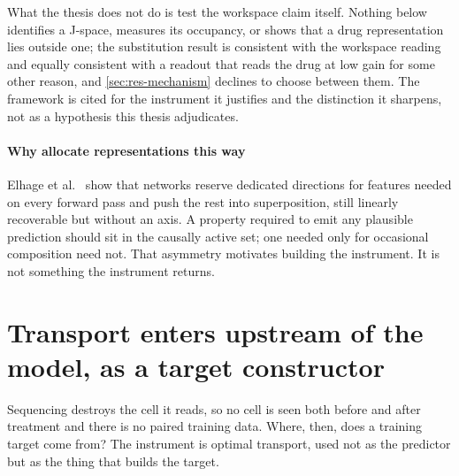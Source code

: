 %
\begin{scopelimit}
What the thesis does not do is test the workspace claim itself. Nothing below
identifies a J-space, measures its occupancy, or shows that a drug
representation lies outside one; the substitution result is consistent with the
workspace reading and equally consistent with a readout that reads the drug at
low gain for some other reason, and \cref{sec:res-mechanism} declines to choose
between them. The framework is cited for the instrument it justifies and the
distinction it sharpens, not as a hypothesis this thesis adjudicates.
\end{scopelimit}

\paragraph{Why allocate representations this way} Elhage et
al.~\cite{superposition} show that networks reserve dedicated directions for
features needed on every forward pass and push the rest into superposition, still
linearly recoverable but without an axis. A property required to emit any
plausible prediction should sit in the causally active set; one needed only for
occasional composition need not. That asymmetry motivates building the
instrument. It is not something the instrument returns.

\section{Transport enters upstream of the model, as a target constructor}
\label{sec:lit-ot}
\framedecl{-}

\begin{question}
Sequencing destroys the cell it reads, so no cell is seen both before and after
treatment and there is no paired training data. Where, then, does a training
target come from? The instrument is optimal transport, used not as the predictor
but as the thing that builds the target.
\end{question}

